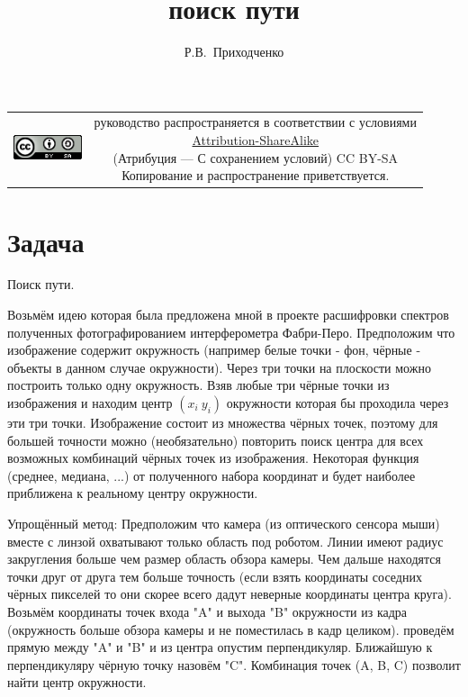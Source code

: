 \documentclass[unicode, 12pt, a4paper,oneside,fleqn]{article}
\author{Р.В.~Приходченко}
\title{поиск пути}
\begin{document}


\maketitle
\tableofcontents


\begin{table}[ht]
  \begin{tabular}{cc}
    \includegraphics[width=2cm]{../CC_BY-SA_88x31.png} &
    \shortstack{руководство распространяется в соответствии с
      условиями\\
      \href{http://creativecommons.org/licenses/by-sa/3.0/}{Attribution-ShareAlike} \\
      (Атрибуция — С сохранением условий) CC BY-SA \\
      Копирование и распространение приветствуется.}
  \end{tabular}
\end{table}

\section{Задача}
 Поиск пути.

  Возьмём идею которая была предложена мной в проекте
  расшифровки спектров полученных фотографированием интерферометра
  Фабри-Перо. Предположим что изображение содержит окружность
  (например белые точки - фон, чёрные - объекты в данном случае
  окружности). Через три точки на плоскости можно построить только
  одну окружность. Взяв любые три чёрные точки из изображения и находим
  центр $(x_i \  y_i)$ окружности которая бы проходила через эти три
  точки. Изображение состоит из множества чёрных точек, поэтому для
  большей точности можно (необязательно) повторить поиск центра для
  всех возможных комбинаций чёрных точек из изображения. Некоторая
  функция (среднее, медиана, ...) от полученного набора координат и
  будет наиболее приближена к реальному центру окружности.

  Упрощённый метод: Предположим что камера (из оптического сенсора
  мыши) вместе с линзой охватывают только область под роботом. Линии
  имеют радиус закругления больше чем размер область обзора камеры.
  Чем дальше находятся точки друг от друга тем больше точность (если
  взять координаты соседних чёрных пикселей то они скорее всего дадут
  неверные координаты центра круга). Возьмём координаты точек входа
  "A" и выхода "B" окружности из кадра (окружность больше обзора
  камеры и не поместилась в кадр целиком). проведём прямую между "A" и
  "B" и из центра опустим перпендикуляр. Ближайшую к перпендикуляру
  чёрную точку назовём "C". Комбинация точек (A, B, C) позволит найти
  центр окружности.
\end{document}
